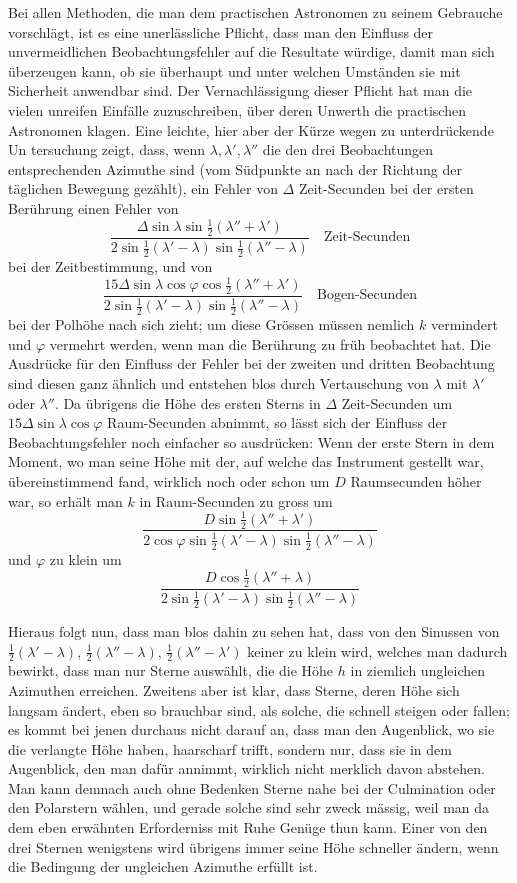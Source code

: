 Bei allen Methoden, die man dem practischen Astronomen zu seinem Gebrauche
vorschlägt, ist es eine unerlässliche Pflicht, dass man den Einfluss der
unvermeidlichen Beobachtungsfehler auf die Resultate würdige, damit man sich
überzeugen kann, ob sie überhaupt und unter welchen Umständen sie mit Sicherheit
anwendbar sind. Der Vernachlässigung dieser Pflicht hat man die vielen
unreifen Einfälle zuzuschreiben, über deren Unwerth die practischen Astronomen
klagen. Eine leichte, hier aber der Kürze wegen zu unterdrückende Un%
%
tersuchung zeigt, dass, wenn $\lambda,\lambda',\lambda''$ die den drei Beobachtungen entsprechenden
Azimuthe sind (vom Südpunkte an nach der Richtung der täglichen Bewegung
gezählt), ein Fehler von $\Delta$ Zeit-Secunden bei der ersten Berührung einen
Fehler von
\[
\frac{\Delta\sin\lambda\sin\tfrac12(\lambda''+\lambda')}{2\sin\tfrac12(\lambda'-\lambda)\sin\tfrac12(\lambda''-\lambda)}\quad\text{Zeit-Secunden}
\]
bei der Zeitbestimmung, und von
\[
\frac{15\Delta\sin\lambda\cos\varphi\cos\tfrac12(\lambda''+\lambda')}{2\sin\tfrac12(\lambda'-\lambda)\sin\tfrac12(\lambda''-\lambda)}\quad\text{Bogen-Secunden}
\]
bei der Polhöhe nach sich zieht; um diese Grössen müssen nemlich $k$ vermindert
und $\varphi$ vermehrt werden, wenn man die Berührung zu früh beobachtet hat.
Die Ausdrücke für den Einfluss der Fehler bei der zweiten und dritten Beobachtung
sind diesen ganz ähnlich und entstehen blos durch Vertauschung von $\lambda$ mit
$\lambda'$ oder $\lambda''$. Da übrigens die Höhe des ersten Sterns in $\Delta$ Zeit-Secunden um
$15\Delta\sin\lambda\cos\varphi$ Raum-Secunden abnimmt, so lässt sich der Einfluss der Beobachtungsfehler
noch einfacher so ausdrücken: Wenn der erste Stern in dem Moment,
wo man seine Höhe mit der, auf welche das Instrument gestellt war, übereinstimmend
fand, wirklich noch oder schon um $D$ Raumsecunden höher war, so
erhält man $k$ in Raum-Secunden zu gross um
\[
\frac{D\sin\tfrac12(\lambda''+\lambda')}{2\cos\varphi\sin\tfrac12(\lambda'-\lambda)\sin\tfrac12(\lambda''-\lambda)}
\]
und $\varphi$ zu klein um
\[
\frac{D\cos\tfrac12(\lambda''+\lambda)}{2\sin\tfrac12(\lambda'-\lambda)\sin\tfrac12(\lambda''-\lambda)}
\]

Hieraus folgt nun, dass man blos dahin zu sehen hat, dass von den Sinussen
von $\tfrac12(\lambda'-\lambda)$, $\tfrac12(\lambda''-\lambda)$, $\tfrac12(\lambda''-\lambda')$ keiner zu klein wird, welches man
dadurch bewirkt, dass man nur Sterne auswählt, die die Höhe $h$ in ziemlich
ungleichen Azimuthen erreichen. Zweitens aber ist klar, dass Sterne, deren
Höhe sich langsam ändert, eben so brauchbar sind, als solche, die schnell steigen
oder fallen; es kommt bei jenen durchaus nicht darauf an, dass man den
Augenblick, wo sie die verlangte Höhe haben, haarscharf trifft, sondern nur,
dass sie in dem Augenblick, den man dafür annimmt, wirklich nicht merklich
davon abstehen. Man kann demnach auch ohne Bedenken Sterne nahe bei der
Culmination oder den Polarstern wählen, und gerade solche sind sehr zweck%
%
mässig, weil man da dem eben erwähnten Erforderniss mit Ruhe Genüge thun
kann. Einer von den drei Sternen wenigstens wird übrigens immer seine Höhe
schneller ändern, wenn die Bedingung der ungleichen Azimuthe erfüllt ist.

